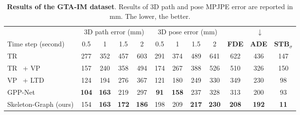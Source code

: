 \documentclass[10pt,twocolumn,letterpaper]{article}
\newcommand*{\ours}{Skeleton-Graph }
\begin{document}
\begin{table*}[ht]
\centering
\scriptsize
\begin{tabular}{lccccccccccc} 
\toprule
                                           & \multicolumn{4}{c}{3D path error (mm)}                    & \multicolumn{4}{c}{3D pose error (mm)} & \multicolumn{3}{c}{$\downarrow$}                                                  \\
Time step (second)                         & 0.5          & 1            & 1.5          & 2            & 0.5         & 1            & 1.5          & 2            & \textbf{FDE}  & \textbf{ADE}  &   $\textbf{STB}_{\sigma} $  \\ 
\midrule
TR~\cite{vaswani2017attention}                        & 277          & 352          & 457          & 603          & 291         & 374          & 489          & 641          & 622 &436  &147                     \\
TR~\cite{vaswani2017attention} + VP~\cite{pavllo20193d}  & 157          & 240          & 358          & 494          & 174         & 267          & 388          & 526          & 510 &326  &150                     \\
VP~\cite{pavllo20193d} + LTD~\cite{wei2019motion} & 124          & 194          & 276          & 367          & 121         & 180          & 249          & 330          & 349 &230   &98                     \\
GPP-Net~\cite{cao2020long}                                    & \textbf{104} & \textbf{163} & 219 & 297 & \textbf{91} & \textbf{158} & 237 & 328 & 313&200   &93           \\ 
\midrule
\ours (ours)                                      & 154          & \textbf{163}          & \textbf{172}          & \textbf{186}          & 198          & 209          & \textbf{217}          & \textbf{230}          & \textbf{208} &\textbf{192}     &\textbf{11}                  \\
\bottomrule
\end{tabular}
\caption{  {\bf Results of the GTA-IM dataset}. Results of 3D path and pose MPJPE error are reported in mm. The lower, the better.}
\label{tab:gta_all}

\end{table*}
\end{document}
